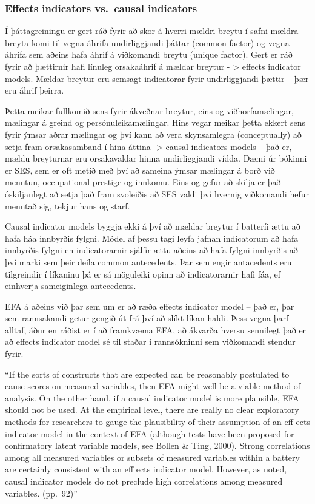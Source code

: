 \documentclass[]{book}
\begin{document}
\hypertarget{effects-indicators-vs.causal-indicators}{%
\subsubsection{Effects indicators vs.~causal indicators}\label{effects-indicators-vs.causal-indicators}}

Í þáttagreiningu er gert ráð fyrir að skor á hverri mældri breytu í safni mældra breyta komi til vegna áhrifa undirliggjandi þáttar (common factor) og vegna áhrifa sem aðeins hafa áhrif á viðkomandi breytu (unique factor). Gert er ráð fyrir að þættirnir hafi línuleg orsakaáhrif á mældar breytur - \textgreater{} effects indicator models. Mældar breytur eru semsagt indicatorar fyrir undirliggjandi þættir -- þær eru áhrif þeirra.

Þetta meikar fullkomið sens fyrir ákveðnar breytur, eins og viðhorfamælingar, mælingar á greind og persónuleikamælingar. Hins vegar meikar þetta ekkert sens fyrir ýmsar aðrar mælingar og því kann að vera skynsamlegra (conceptually) að setja fram orsakasamband í hina áttina -\textgreater{} causal indicators models -- það er, mældu breyturnar eru orsakavaldar hinna undirliggjandi vídda. Dæmi úr bókinni er SES, sem er oft metið með því að sameina ýmsar mælingar á borð við menntun, occupational prestige og innkomu. Eins og gefur að skilja er það óskiljanlegt að setja það fram svoleiðis að SES valdi því hvernig viðkomandi hefur menntað sig, tekjur hans og starf.

Causal indicator models byggja ekki á því að mældar breytur í batteríi ættu að hafa háa innbyrðis fylgni. Módel af þessu tagi leyfa jafnan indicatorum að hafa innbyrðis fylgni en indicatorarnir sjálfir ættu aðeins að hafa fylgni innbyrðis að því marki sem þeir deila common antecedents. Þar sem engir antacedents eru tilgreindir í líkaninu þá er sá möguleiki opinn að indicatorarnir hafi fáa, ef einhverja sameiginlega antecedents.

EFA á aðeins við þar sem um er að ræða effects indicator model -- það er, þar sem rannsakandi getur gengið út frá því að slíkt líkan haldi. Þess vegna þarf alltaf, áður en ráðist er í að framkvæma EFA, að ákvarða hversu sennilegt það er að effects indicator model sé til staðar í rannsókninni sem viðkomandi stendur fyrir.

``If the sorts of constructs that are expected can be reasonably postulated to cause scores on measured variables, then EFA might well be a viable method of analysis. On the other hand, if a causal indicator model is more plausible, EFA should not be used. At the empirical level, there are really no clear exploratory methods for researchers to gauge the plausibility of their assumption of an eff ects indicator model in the context of EFA (although tests have been proposed for confirmatory latent variable models, see Bollen \& Ting, 2000). Strong correlations among all measured variables or subsets of measured variables within a battery are certainly consistent with an eff ects indicator model. However, as noted, causal indicator models do not preclude high correlations among measured variables. (pp.~92)''
\end{document}
